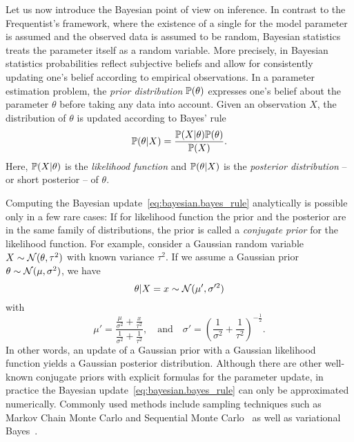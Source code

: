 
Let us now introduce the Bayesian point of view on inference.
In contrast to the Frequentist's framework, where the existence of a single  for the model parameter is assumed and the observed data is assumed to be random, Bayesian statistics treats the parameter itself as a random variable.
More precisely, in Bayesian statistics probabilities reflect subjective beliefs and allow for consistently updating one's belief according to empirical observations.
In a parameter estimation problem, the \emph{prior distribution} $\mathbb{P}(\theta)$ expresses one's belief about the parameter $\theta$ before taking any data into account.
Given an observation $X$, the distribution of $\theta$ is updated according to Bayes' rule~\cite{}
\[
  \label{eq:bayesian.bayes_rule}
  \mathbb{P}(\theta | X) = \frac{\mathbb{P}(X | \theta) \mathbb{P}(\theta)}{\mathbb{P}(X)}.
\]
Here, $\mathbb{P}(X|\theta)$ is the \emph{likelihood function} and $\mathbb{P}(\theta | X)$ is the \emph{posterior distribution} -- or short posterior -- of $\theta$.

Computing the Bayesian update~\eqref{eq:bayesian.bayes_rule} analytically is possible only in a few rare cases:
If for likelihood function the prior and the posterior are in the same family of distributions, the prior is called a \emph{conjugate prior} for the likelihood function.
For example, consider a Gaussian random variable $X \sim \mathcal{N}(\theta, \tau^2)$ with known variance $\tau^2$.
If we assume a Gaussian prior $\theta \sim \mathcal{N}(\mu, \sigma^2)$, we have~\cite{}
\[
  \theta \vert X=x \sim \mathcal{N} (\mu', \sigma'^2)
\]
with
\[
  \label{eq:bayesian.kalman}
  \mu' = \frac{ \frac{\mu}{\sigma^2} + \frac{x}{\tau^2} }{ \frac{1}{\sigma^2} + \frac{1}{\tau^2} },
  \quad\mbox{and}\quad
  \sigma' = \left( \frac{1}{\sigma^2} + \frac{1}{\tau^2} \right)^{- \tfrac{1}{2}}.
\]
In other words, an update of a Gaussian prior with a Gaussian likelihood function yields a Gaussian posterior distribution.
Although there are other well-known conjugate priors with explicit formulas for the parameter update, in practice the Bayesian update~\eqref{eq:bayesian.bayes_rule} can only be approximated numerically.
Commonly used methods include sampling techniques such as Markov Chain Monte Carlo and Sequential Monte Carlo~\cite{} as well as variational Bayes~\cite{}.\\


